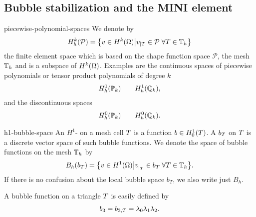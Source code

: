 \subsection{Bubble stabilization and the MINI element}

\begin{Notation}{piecewise-polynomial-spaces}
  We denote by
  \begin{gather}
    \label{eq:stokes:8}
    H^k_h(\mathcal P) =
    \bigl\{ v\in H^k(\Omega) \big\vert
    v_{|T} \in \mathcal P \;\forall T\in\mathbb T_h\bigr\}
  \end{gather}
  the finite element space which is based on the shape function space
  $\mathcal P$, the mesh $\mathbb T_h$ and is a subspace of
  $H^k(\Omega)$. Examples are the continuous spaces of piecewise
  polynomials or tensor product polynomials of degree $k$
  \begin{gather}
    H^1_h(\mathbb P_k) \qquad H^1_h(\mathbb Q_k),
  \end{gather}
  and the discontinuous spaces
  \begin{gather}
    H^0_h(\mathbb P_k) \qquad H^0_h(\mathbb Q_k).
  \end{gather}
\end{Notation}

\begin{Definition}{h1-bubble-space}
  An $H^1$- on a mesh cell $T$ is a
  function $b\in H^1_0(T)$. A  $b_T$ on
  $T$ is a discrete vector space of such bubble functions.  We
  denote the space of bubble functions on the mesh $\mathbb T_h$ by
  \begin{gather}
    B_h(b_T) = \bigl\{ v\in H^1(\Omega) \big\vert
    v_{|_T} \in b_T \;\forall T\in\mathbb T_h
    \bigr\}.
  \end{gather}
  If there is no confusion about the local bubble space $b_T$, we also
  write just $B_h$.
\end{Definition}

\begin{example}
  A bubble function on a triangle $T$ is easily defined by
  \begin{gather}
    \label{eq:stokes:7}
    b_3 = b_{3,T} = \lambda_0\lambda_1\lambda_2.
  \end{gather}
\end{example}

